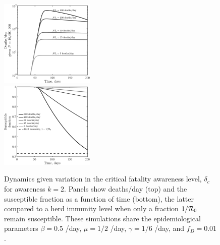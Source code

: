 \begin{figure}[t!]
\begin{center}
\includegraphics[width=0.4\textwidth]{scripts/figseir_Speak_k2_noname.pdf}\\
\includegraphics[width=0.4\textwidth]{scripts/figseir_Susc_k2_noname.pdf}
\caption{Dynamics given variation in the critical fatality awareness
level, $\delta_c$ for awareness $k=2$. Panels show
deaths/day (top) and the susceptible fraction as a function of time (bottom),
the latter compared to a herd immunity
level when only a fraction $1/{\cal{R}}_0$ remain susceptible.
These simulations share the
epidemiological parameters 
$\beta=0.5$ /day, $\mu=1/2$ /day, $\gamma=1/6$ /day,
and $f_D=0.01$.
\label{fig.generic}}
\end{center}
\end{figure}

